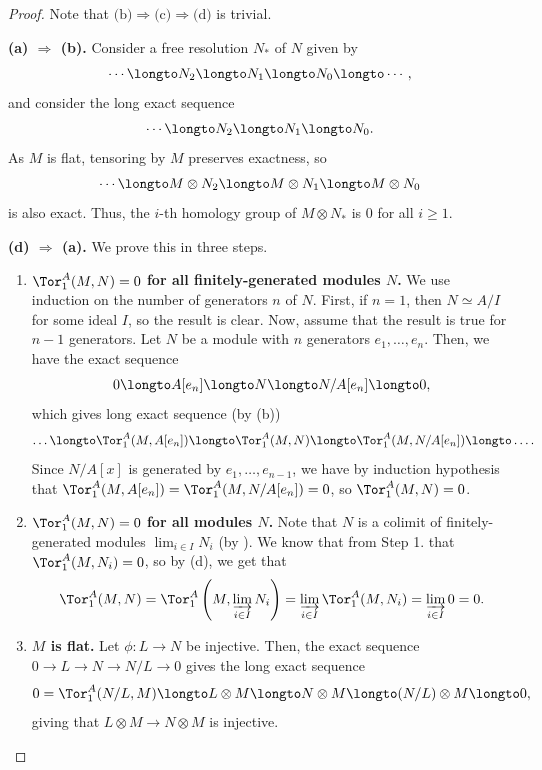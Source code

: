 \begin{proof}
    Note that $\text{(b)}\Rightarrow\text{(c)}\Rightarrow \text{(d)}$ is trivial.

    \textbf{(a) $\Rightarrow$ (b).} Consider a free resolution $N_*$ of $N$ given by \[\cdots \longto N_2\longto N_1\longto N_0\longto \cdots,\] and consider the long exact sequence \[\cdots \longto N_2\longto N_1 \longto N_0.\] As $M$ is flat, tensoring by $M$ preserves exactness, so \[\cdots \longto M\otimes N_2\longto M\otimes N_1\longto M\otimes N_0\] is also exact. Thus, the $i$-th homology group of $M\otimes N_*$ is $0$ for all $i\ge 1$.

    
    \textbf{(d) $\Rightarrow$ (a).} 
    We prove this in three steps.
    \begin{enumerate}
    \item  \textbf{$\Tor_1^A(M,N)=0$ for all finitely-generated modules $N$.}
    We use induction on the number of generators $n$ of $N$.
    First, if $n=1$, then $N\simeq A/I$ for some ideal $I$,
    so the result is clear.
    Now, assume that the result is true for $n-1$ generators.
    Let $N$ be a module with $n$ generators
    $e_1,\dots,e_n$. Then, we have the exact sequence
    $$0\longto A[e_n] \longto N \longto N/A[e_n]\longto 0,$$
    which gives long exact sequence
    (by  (b))
    $$\dots\longto \Tor_1^A(M,A[e_n]) \longto \Tor_1^A(M,N) \longto \Tor_1^A(M,N/A[e_n])
    \longto \dots.$$
    Since $N/A[x]$ is generated by $e_1,\dots,e_{n-1}$,
    we have by induction hypothesis that
    $\Tor_1^A(M, A[e_n]) = \Tor_1^A(M, N/A[e_n]) = 0$,
    so $\Tor_1^A(M,N) = 0$.
    \item \textbf{$\Tor_1^A(M,N)=0$ for all modules $N$.}
    Note that $N$ is a colimit of finitely-generated modules
    $\lim_{i\in I} N_i$ (by ).
    We know that from Step 1. that $\Tor_1^A(M,N_i)=0$, so 
    by  (d), we get that
    $$\Tor_1^A(M,N) = 
    \Tor_1^A \left(M, \varinjlim_{i\in I} N_i \right)
    = \varinjlim_{i\in I} \Tor_1^A(M,N_i)
    = \varinjlim_{i\in I} 0 = 0.$$
    \item \textbf{$M$ is flat.}
    Let $\phi : L\to N$ be injective.
    Then, the exact sequence $0\to L\to N\to N/L\to 0$
    gives  the long exact sequence
    $$0 = \Tor_1^A(N/L, M)
    \longto L\otimes M \longto N\otimes M
    \longto (N/L)\otimes M\longto 0,$$
    giving that $L\otimes M\to N\otimes M$ is injective.
    \qedhere
    \end{enumerate}
\end{proof}
